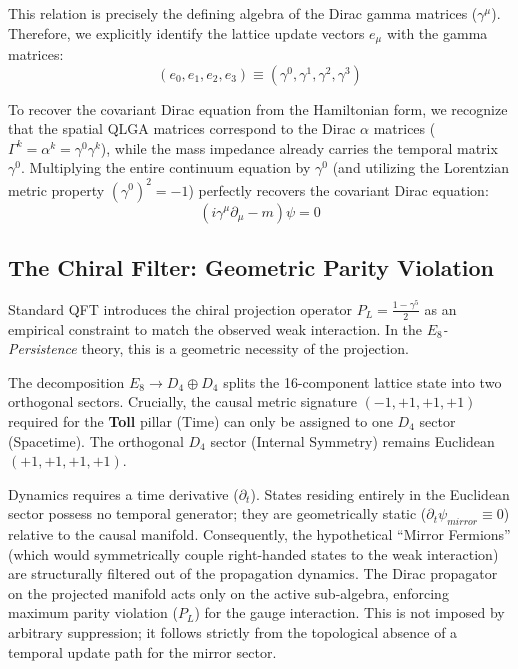 This relation is precisely the defining algebra of the Dirac gamma matrices ($\gamma^\mu$). Therefore, we explicitly identify the lattice update vectors $e_\mu$ with the gamma matrices:
\begin{equation}
    (e_0, e_1, e_2, e_3) \equiv (\gamma^0, \gamma^1, \gamma^2, \gamma^3)
\end{equation}

To recover the covariant Dirac equation from the Hamiltonian form, we recognize that the spatial QLGA matrices correspond to the Dirac $\alpha$ matrices ($\Gamma^k = \alpha^k = \gamma^0 \gamma^k$), while the mass impedance already carries the temporal matrix $\gamma^0$. Multiplying the entire continuum equation by $\gamma^0$ (and utilizing the Lorentzian metric property $(\gamma^0)^2 = -1$) perfectly recovers the covariant Dirac equation:
\begin{equation}
    (i\gamma^\mu \partial_\mu - m)\psi = 0
\end{equation}

\subsection{The Chiral Filter: Geometric Parity Violation}
Standard QFT introduces the chiral projection operator $P_L = \frac{1-\gamma^5}{2}$ as an empirical constraint to match the observed weak interaction. In the \textit{$E_8$-Persistence} theory, this is a geometric necessity of the projection.

The decomposition $E_8 \to D_4 \oplus D_4$ splits the 16-component lattice state into two orthogonal sectors. Crucially, the causal metric signature $(-1, +1, +1, +1)$ required for the \textbf{Toll} pillar (Time) can only be assigned to one $D_4$ sector (Spacetime). The orthogonal $D_4$ sector (Internal Symmetry) remains Euclidean $(+1, +1, +1, +1)$.

Dynamics requires a time derivative ($\partial_t$). States residing entirely in the Euclidean sector possess no temporal generator; they are geometrically static ($\partial_t \psi_{mirror} \equiv 0$) relative to the causal manifold. Consequently, the hypothetical ``Mirror Fermions'' (which would symmetrically couple right-handed states to the weak interaction) are structurally filtered out of the propagation dynamics. The Dirac propagator on the projected manifold acts only on the active sub-algebra, enforcing maximum parity violation ($P_L$) for the gauge interaction. This is not imposed by arbitrary suppression; it follows strictly from the topological absence of a temporal update path for the mirror sector.

